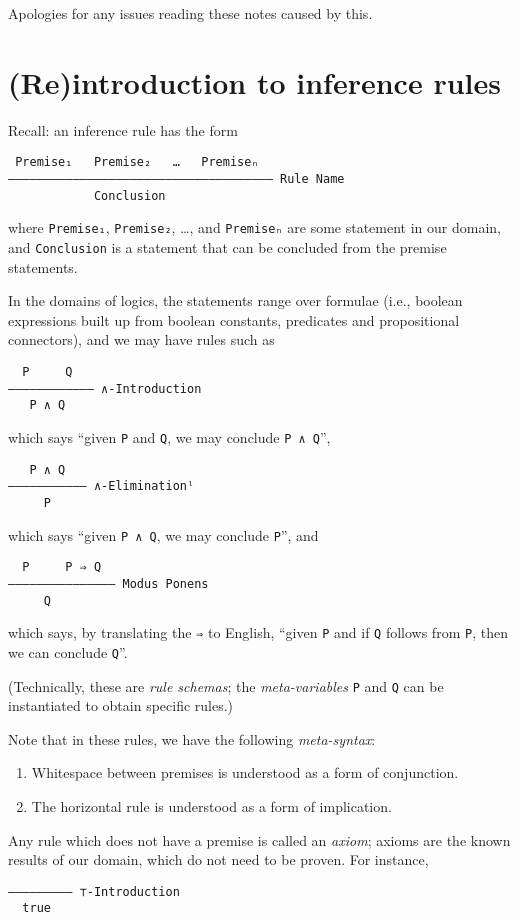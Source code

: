 \documentclass[11pt]{article}
\begin{document}
Apologies for any issues reading these notes caused by this.

\section{(Re)introduction to inference rules}
\label{sec:org094e8ff}
Recall: an inference rule has the form
\begin{verbatim}
 Premise₁   Premise₂   …   Premiseₙ
————————————————————————————————————— Rule Name
            Conclusion
\end{verbatim}
where \texttt{Premise₁}, \texttt{Premise₂}, …, and \texttt{Premiseₙ} are some statement in our
domain, and \texttt{Conclusion} is a statement
that can be concluded from the premise statements.

In the domains of logics, the statements range over formulae
(i.e., boolean expressions built up from
boolean constants, predicates and propositional connectors),
and we may have rules such as
\begin{verbatim}
  P     Q
——————————–— ∧-Introduction
   P ∧ Q
\end{verbatim}
which says “given \texttt{P} and \texttt{Q}, we may conclude \texttt{P ∧ Q}”,
\begin{verbatim}
   P ∧ Q
——————————— ∧-Eliminationˡ
     P
\end{verbatim}
which says “given \texttt{P ∧ Q}, we may conclude \texttt{P}”, and
\begin{verbatim}
  P     P ⇒ Q
——————————————— Modus Ponens
     Q
\end{verbatim}
which says, by translating the \texttt{⇒} to English,
“given \texttt{P} and if \texttt{Q} follows from \texttt{P}, then we can conclude \texttt{Q}”.

(Technically, these are \emph{rule schemas};
the \emph{meta-variables} \texttt{P} and \texttt{Q} can be instantiated
to obtain specific rules.)

Note that in these rules, we have the following \emph{meta-syntax}:
\begin{enumerate}
\item Whitespace between premises is understood as a form of conjunction.
\item The horizontal rule is understood as a form of implication.
\end{enumerate}

Any rule which does not have a premise is called an \emph{axiom};
axioms are the known results of our domain, which do not need to be proven.
For instance,
\begin{verbatim}
————————— ⊤-Introduction
  true
\end{verbatim}
\end{document}
